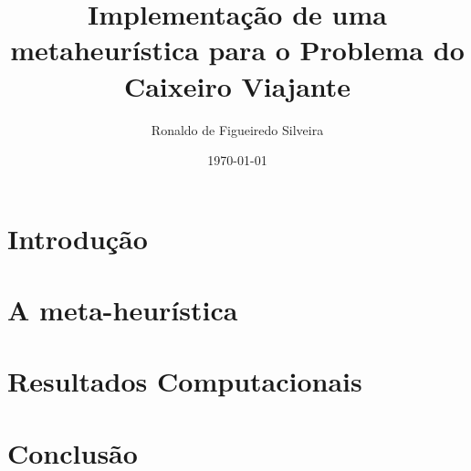 \documentclass[a4paper]{article}
\title{Implementação de uma metaheurística para o Problema do Caixeiro Viajante}
\author{Ronaldo de Figueiredo Silveira }
\date{\today}
\begin{document}
	\maketitle
    
    
    
    
    \section{Introdução}
    	
    	
    \section{A meta-heurística}
	    
	    
	\section{Resultados Computacionais}
		

	\section{Conclusão}
		        
    
    
\end{document}
